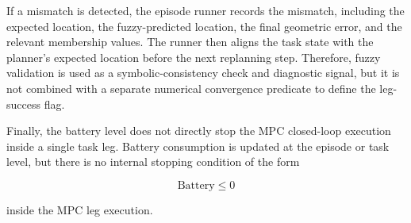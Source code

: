 \documentclass{article}
\begin{document}
If a mismatch is detected, the episode runner records the mismatch, including the expected location, the fuzzy-predicted location, the final geometric error, and the relevant membership values. The runner then aligns the task state with the planner's expected location before the next replanning step. Therefore, fuzzy validation is used as a symbolic-consistency check and diagnostic signal, but it is not combined with a separate numerical convergence predicate to define the leg-success flag.

Finally, the battery level does not directly stop the MPC closed-loop execution inside a single task leg. Battery consumption is updated at the episode or task level, but there is no internal stopping condition of the form

\[
\mathrm{Battery} \leq 0
\]

inside the MPC leg execution.
\end{document}
